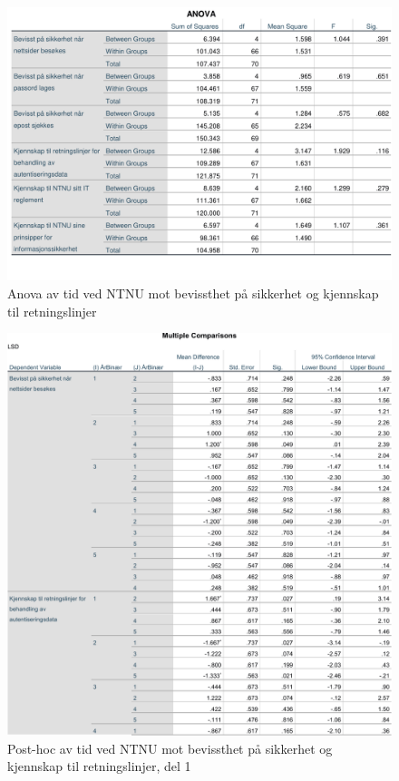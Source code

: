 \begin{figure}[H]
    \centering
    \includegraphics[scale=0.7]{case_2/bilder/spss/anova_ttest/ansiennitet_bevissthetogkjennskap_anova.pdf}
    \caption[Antall år ved NTNU mot bevissthet og kjennskap ANOVA]{Anova av tid ved NTNU mot bevissthet på sikkerhet og kjennskap til retningslinjer}
    \label{fig:ansiennitet-bevissthetogkjennskap-anova}
\end{figure}

\begin{figure}[H]
    \centering
    \includegraphics[scale=0.7]{case_2/bilder/spss/anova_ttest/ansiennitet_bevissthetogkjennskap_posthoc_1.pdf}
    \caption[Antall år ved NTNU mot bevissthet og kjennskap post-hoc 1]{Post-hoc av tid ved NTNU mot bevissthet på sikkerhet og kjennskap til retningslinjer, del 1}
    \label{fig:ansiennitet-bevissthetogkjennskap-posthoc-1}
\end{figure}

